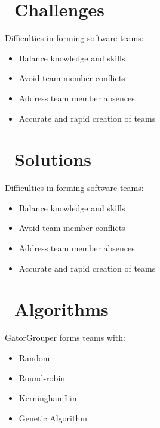\documentclass[a0paper,fleqn]{betterposter}
\begin{document}
{  %

  \vspace*{-.25in}
  \section{\faCube~Challenges}
  Difficulties in forming software teams:
  \begin{itemize}
    \item Balance knowledge and skills
    \item Avoid team member conflicts
    \item Address team member absences
    \item Accurate and rapid creation of teams
  \end{itemize}

  \vspace*{-.25in}
  \section{\faTrophy~Solutions}
  Difficulties in forming software teams:
  \begin{itemize}
    \item Balance knowledge and skills
    \item Avoid team member conflicts
    \item Address team member absences
    \item Accurate and rapid creation of teams
  \end{itemize}

  \vspace*{-.25in}
  \section{\faCog~Algorithms}
  GatorGrouper forms teams with:
  \begin{itemize}
    \item Random
    \item Round-robin
    \item Kerninghan-Lin
    \item Genetic Algorithm
  \end{itemize}

}
\end{document}
